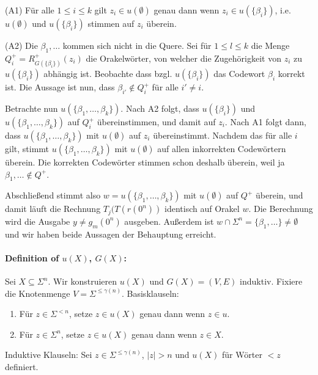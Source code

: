 \documentclass[nofonts]{uebung}
\begin{document}
(A1) Für alle $1\leq i\leq k$ gilt $z_i\in u(\emptyset)$ genau dann wenn $z_i\in u(\{\beta_i\})$, i.e. $u(\emptyset)$ und $u(\{\beta_i\})$ stimmen auf $z_i$ überein.

(A2) Die $\beta_1, \dots$ kommen sich nicht in die Quere. Sei für $1\leq l\leq k$ die Menge $Q^+_i=R^+_{G(\{\beta_i\})}(z_i)$ die Orakelwörter, von welcher die Zugehörigkeit von $z_i$ zu $u(\{\beta_i\})$ abhängig ist.
Beobachte dass bzgl. $u(\{\beta_i\})$ das Codewort $\beta_i$ korrekt ist.
Die Aussage ist nun, dass $\beta_{i'}\not\in Q^+_i$ für alle $i'\neq i$.

Betrachte nun $u(\{\beta_1, \dots, \beta_k\})$. Nach A2 folgt, dass $u(\{\beta_i\})$ und $u(\{\beta_1, \dots, \beta_k\})$ auf $Q^+_i$ übereinstimmen, und damit auf $z_i$.
Nach A1 folgt dann, dass $u(\{\beta_1, \dots, \beta_k\})$ mit $u(\emptyset)$ auf $z_i$ übereinstimmt.
Nachdem das für alle $i$ gilt, stimmt $u(\{\beta_1, \dots, \beta_k\})$ mit $u(\emptyset)$ auf allen inkorrekten Codewörtern überein.
Die korrekten Codewörter stimmen schon deshalb überein, weil ja $\beta_1, \dots\not\in Q^+$.

Abschließend stimmt also $w=u(\{\beta_1, \dots, \beta_k\})$ mit $u(\emptyset)$ auf $Q^+$ überein, und damit läuft die Rechnung $T_j(T(r(0^n))$ identisch auf Orakel $w$.
Die Berechnung wird die Ausgabe $y\neq g_m(0^n)$ ausgeben.
Außerdem ist $w\cap\Sigma^n=\{\beta_1, \dots\}\neq \emptyset$ und wir haben beide Aussagen der Behauptung erreicht.


\paragraph{Definition of $u(X)$, $G(X)$:} Sei $X\subseteq\Sigma^n$. Wir konstruieren $u(X)$ und $G(X)=(V,E)$ induktiv. Fixiere die Knotenmenge $V=\Sigma^{\leq\gamma(n)}$.
Basisklauseln: 
\begin{enumerate}[label=(\arabic*)]
    \item Für $z\in \Sigma^{<n}$, setze $z\in u(X)$ genau dann wenn $z\in u$.
    \item Für $z\in \Sigma^{n}$, setze $z\in u(X)$ genau dann wenn $z\in X$.
\end{enumerate}
Induktive Klauseln: Sei $z\in\Sigma^{\leq \gamma(n)}$, $|z|>n$ und $u(X)$ für Wörter $<z$ definiert.
\end{document}
